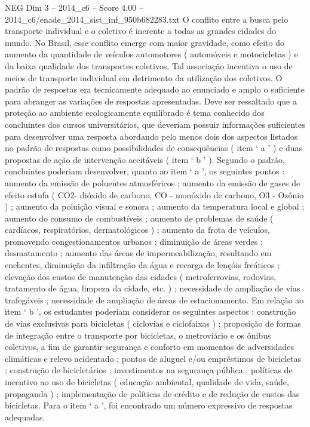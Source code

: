 \begin{textsample}{NEG Dim 3 – 2014\_c6 – Score 4.00 – 2014\_c6/enade\_2014\_sist\_inf\_950b682283.txt}
O conflito entre a busca pelo transporte individual e o coletivo é inerente a todas as grandes cidades do mundo.
No Brasil, esse conflito emerge com maior gravidade, como efeito do aumento da quantidade de veículos automotores ( automóveis e motocicletas ) e da baixa qualidade dos transportes coletivos.
Tal associação incentiva o uso de meios de transporte individual em detrimento da utilização dos coletivos.
O padrão de respostas era tecnicamente adequado ao enunciado e amplo o suficiente para abranger as variações de respostas apresentadas.
Deve ser ressaltado que a proteção ao ambiente ecologicamente equilibrado é tema conhecido dos concluintes dos cursos universitários, que deveriam possuir informações suficientes para desenvolver uma resposta abordando pelo menos dois dos aspectos listados no padrão de respostas como possibilidades de consequências ( item ‘ a ’ ) e duas propostas de ação de intervenção aceitáveis ( item ‘ b ’ ).
Segundo o padrão, concluintes poderiam desenvolver, quanto ao item ‘ a ’, os seguintes pontos : aumento da emissão de poluentes atmosféricos ; aumento da emissão de gases de efeito estufa ( CO2- dióxido de carbono, CO - monóxido de carbono, O3 - Ozônio ) ; aumento da poluição visual e sonora ; aumento da temperatura local e global ; aumento do consumo de combustíveis ; aumento de problemas de saúde ( cardíacos, respiratórios, dermatológicos ) ; aumento da frota de veículos, promovendo congestionamentos urbanos ; diminuição de áreas verdes ; desmatamento ; aumento das áreas de impermeabilização, resultando em enchentes, diminuição da infiltração da água e recarga de lençóis freáticos ; elevação dos custos de manutenção das cidades ( metroferrovias, rodovias, tratamento de água, limpeza da cidade, etc. ) ; necessidade de ampliação de vias trafegáveis ; necessidade de ampliação de áreas de estacionamento.
Em relação ao item ‘ b ’, os estudantes poderiam considerar os seguintes aspectos : construção de vias exclusivas para bicicletas ( ciclovias e ciclofaixas ) ; proposição de formas de integração entre o transporte por bicicletas, o metroviário e os ônibus coletivos, a fim de garantir segurança e conforto em momentos de adversidades climáticas e relevo acidentado ; pontos de aluguel e/ou empréstimos de bicicletas ; construção de bicicletários ; investimentos na segurança pública ; políticas de incentivo ao uso de bicicletas ( educação ambiental, qualidade de vida, saúde, propaganda ) ; implementação de políticas de crédito e de redução de custos das bicicletas.
Para o item ‘ a ’, foi encontrado um número expressivo de respostas adequadas.

\end{textsample}
